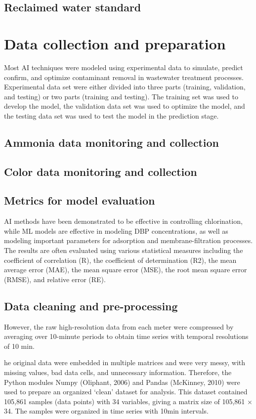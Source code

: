 \subsection{Reclaimed water standard }
\section{Data collection and preparation}
Most AI techniques were modeled using experimental data to simulate, predict confirm, and optimize contaminant removal in wastewater treatment processes. Experimental data set were either divided into three parts (training, validation, and testing) or two parts (training and testing). The training set was used to develop the model, the validation data set was used to optimize the model, and the testing data set was used to test the model in the prediction stage.
\subsection{Ammonia data monitoring and collection}
\subsection{Color data monitoring and collection}
\subsection{Metrics for model evaluation}
AI methods have been demonstrated to be effective in controlling chlorination, while ML models are effective in modeling DBP concentrations, as well as modeling important parameters for adsorption and membrane-filtration processes. The results are often evaluated using various statistical measures including the coefficient of correlation (R), the coefficient of determination (R2), the mean average error (MAE), the mean square error (MSE), the root mean square error (RMSE), and relative error (RE).
\subsection{Data cleaning and pre-processing}
However, the raw high-resolution data from each meter were compressed by averaging over 10-minute periods to obtain time series with temporal resolutions of 10 min.

he original data were embedded in multiple matrices and were very messy, with missing values, bad data cells, and unnecessary information. Therefore, the Python modules Numpy (Oliphant, 2006) and Pandas (McKinney, 2010) were used to prepare an organized ‘clean’ dataset for analysis. This dataset contained 105,861 samples (data points) with 34 variables, giving a matrix size of 105,861 × 34. The samples were organized in time series with 10min intervals.
